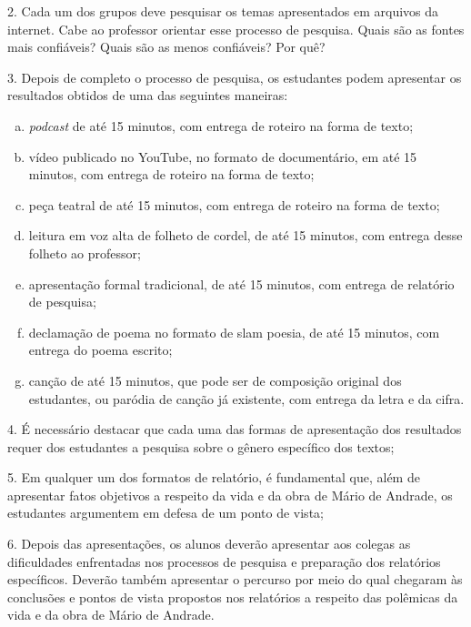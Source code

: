 \documentclass[11pt]{extarticle}
\begin{document}
2. Cada um dos grupos deve pesquisar os temas apresentados em arquivos
da internet. Cabe ao professor orientar esse processo de pesquisa. Quais
são as fontes mais confiáveis? Quais são as menos confiáveis? Por quê?

3. Depois de completo o processo de pesquisa, os estudantes podem
apresentar os resultados obtidos de uma das seguintes maneiras:

\begin{enumerate}[(a)]

\item \textit{podcast} de até 15 minutos, com entrega de roteiro na forma de texto;

\item vídeo publicado no YouTube, no formato de documentário, em até 15
minutos, com entrega de roteiro na forma de texto;

\item peça teatral de até 15 minutos, com entrega de roteiro na forma de
texto;

\item leitura em voz alta de folheto de cordel, de até 15 minutos, com
entrega desse folheto ao professor;

\item apresentação formal tradicional, de até 15 minutos, com entrega de
relatório de pesquisa;

\item declamação de poema no formato de slam poesia, de até 15 minutos, com
entrega do poema escrito;

\item canção de até 15 minutos, que pode ser de composição original dos
estudantes, ou paródia de canção já existente, com entrega da letra e da
cifra.
\end{enumerate} 

4. É necessário destacar que cada uma das formas de apresentação dos
resultados requer dos estudantes a pesquisa sobre o gênero específico
dos textos;

5. Em qualquer um dos formatos de relatório, é fundamental que, além de
apresentar fatos objetivos a respeito da vida e da obra de Mário de
Andrade, os estudantes argumentem em defesa de um ponto de vista;

6. Depois das apresentações, os alunos deverão apresentar aos colegas as
dificuldades enfrentadas nos processos de pesquisa e preparação dos
relatórios específicos. Deverão também apresentar o percurso por meio do
qual chegaram às conclusões e pontos de vista propostos nos relatórios a
respeito das polêmicas da vida e da obra de Mário de Andrade.
\end{document}
